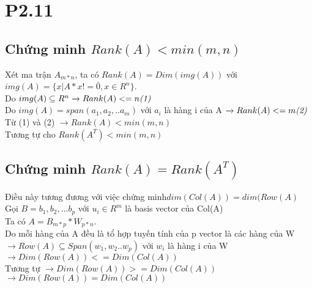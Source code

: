 \documentclass[a4paper,11pt]{article}
\theoremstyle{mytheor}
\begin{document}
\section*{P2.11}
\subsection*{Chứng minh $Rank(A)<min(m,n)$}
Xét ma trận $A_{m*n}$, ta có $Rank(A) = Dim(img(A))$ với $img(A) = \{x|A*x!=\bar{0},x \in R^n\}$. \\
Do $img(A) \subseteq R^n \xrightarrow{} Rank(A) <= n \hfill \textit{(1)}$\\ 
Do $img(A) = span(a_1,a_2,..a_m)$ với $a_i$ là hàng i của A $\xrightarrow{} Rank(A) <= m\hfill \textit{(2)}$\\
Từ (1) và (2) $\xrightarrow{} Rank(A)<min(m,n)$\\
Tương tự cho  $Rank(A^T)<min(m,n)$
\subsection*{Chứng minh $Rank(A) = Rank(A^T)$}
Điều này tương đương với việc chứng minh$ dim(Col(A)) = dim(Row(A)$\\
Gọi $B = b_1,b_2,...b_p$ với $u_i \in R^m$ là basis vector của Col(A)\\
Ta có $A = B_{m*p}*W_{p*n}$. 
\\ Do mỗi hàng của A đều là tổ hợp tuyến tính của p vector là các hàng của W\\
$\xrightarrow{} Row(A)\subseteq Span(w_1,w_2..w_p)$ với $w_i$ là hàng i của W\\
$\xrightarrow{} Dim(Row(A)) <= Dim(Col(A))$\\
Tương tự $\xrightarrow{} Dim(Row(A)) >= Dim(Col(A))$\\
$\xrightarrow{} Dim(Row(A)) = Dim(Col(A))$
\end{document}
